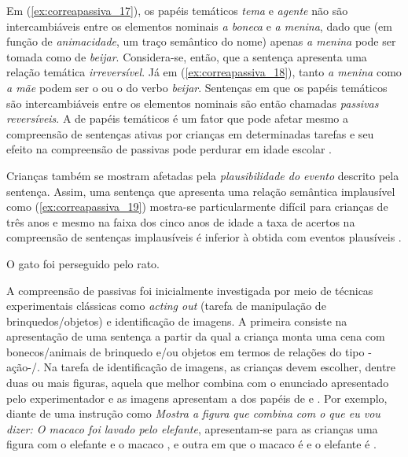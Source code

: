 \documentclass[output=paper]{LSP/langsci}
\begin{document}
Em (\ref{ex:correapassiva_17}), os papéis temáticos \textit{tema} e \textit{agente} não são intercambiáveis entre os elementos nominais \textit{a boneca} e \textit{a menina}, dado que (em função de \textit{animacidade}, um traço semântico do nome) apenas \textit{a menina} pode ser tomada como  de \textit{beijar}. Considera-se, então, que a sentença apresenta uma relação temática \textit{irreversível}. Já em (\ref{ex:correapassiva_18}), tanto \textit{a menina} como \textit{a mãe} podem ser o  ou o  do verbo \textit{beijar}. Sentenças em que os papéis temáticos são intercambiáveis entre os elementos nominais são então chamadas \textit{passivas reversíveis}. A  de papéis temáticos é um fator que pode afetar mesmo a compreensão de sentenças ativas por crianças em determinadas tarefas e seu efeito na compreensão de passivas pode perdurar em idade escolar \citep{augustocorrea2012}.

Crianças também se mostram afetadas pela \textit{plausibilidade do evento} descrito pela sentença. Assim, uma sentença que apresenta uma relação semântica implausível como (\ref{ex:correapassiva_19}) mostra-se particularmente difícil para crianças de três anos e mesmo na faixa dos cinco anos de idade a taxa de acertos na compreensão de sentenças implausíveis é inferior à obtida com eventos plausíveis \citep{strohnernelson1974}.

\ea\label{ex:correapassiva_19} O gato foi perseguido pelo rato.
\z

A compreensão de passivas foi inicialmente investigada por meio de técnicas experimentais clássicas como \textit{acting out} (tarefa de manipulação de brinquedos/objetos) e identificação de imagens. A primeira consiste na apresentação de uma sentença a partir da qual a criança monta uma cena com bonecos/animais de brinquedo e/ou objetos em termos de relações do tipo -ação-/. Na tarefa de identificação de imagens, as crianças devem escolher, dentre duas ou mais figuras, aquela que melhor combina com o enunciado apresentado pelo experimentador e as imagens apresentam a  dos papéis de  e . Por exemplo, diante de uma instrução como \textit{Mostra a figura que combina com o que eu vou dizer: O macaco foi lavado pelo elefante}, apresentam-se para as crianças uma figura com o elefante  e o macaco , e outra em que o macaco é  e o elefante é . 
\end{document}
